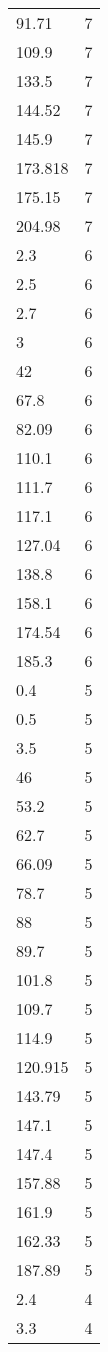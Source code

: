 \begin{table}[ht]
\begin{tabular}{lr}
  91.71 &   7 \\ 
  109.9 &   7 \\ 
  133.5 &   7 \\ 
  144.52 &   7 \\ 
  145.9 &   7 \\ 
  173.818 &   7 \\ 
  175.15 &   7 \\ 
  204.98 &   7 \\ 
  2.3 &   6 \\ 
  2.5 &   6 \\ 
  2.7 &   6 \\ 
  3 &   6 \\ 
  42 &   6 \\ 
  67.8 &   6 \\ 
  82.09 &   6 \\ 
  110.1 &   6 \\ 
  111.7 &   6 \\ 
  117.1 &   6 \\ 
  127.04 &   6 \\ 
  138.8 &   6 \\ 
  158.1 &   6 \\ 
  174.54 &   6 \\ 
  185.3 &   6 \\ 
  0.4 &   5 \\ 
  0.5 &   5 \\ 
  3.5 &   5 \\ 
  46 &   5 \\ 
  53.2 &   5 \\ 
  62.7 &   5 \\ 
  66.09 &   5 \\ 
  78.7 &   5 \\ 
  88 &   5 \\ 
  89.7 &   5 \\ 
  101.8 &   5 \\ 
  109.7 &   5 \\ 
  114.9 &   5 \\ 
  120.915 &   5 \\ 
  143.79 &   5 \\ 
  147.1 &   5 \\ 
  147.4 &   5 \\ 
  157.88 &   5 \\ 
  161.9 &   5 \\ 
  162.33 &   5 \\ 
  187.89 &   5 \\ 
  2.4 &   4 \\ 
  3.3 &   4 \\ 

\end{tabular}
\end{table}
